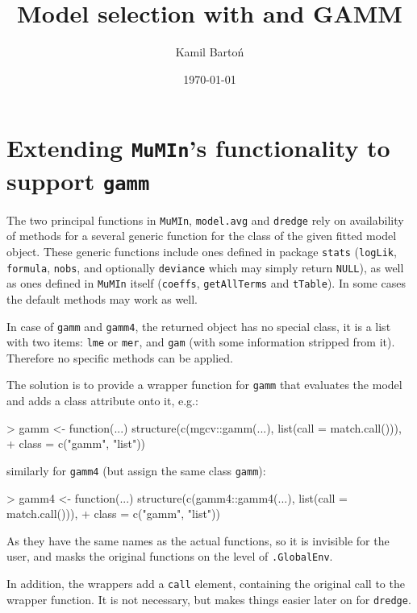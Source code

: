 \documentclass{article}
\title{Model selection with \pkg{MuMIn} and GAMM}
\date{\today}
\author{Kamil Bartoń}
\newcommand{\code}[1]{{\tt #1}}
\newcommand{\pkg}[1]{{\tt #1}}
\begin{document}
\maketitle


\section{Extending \pkg{MuMIn}'s functionality to support \code{gamm} }

The two principal functions in \pkg{MuMIn}, \code{model.avg} and \code{dredge} rely on 
availability of methods for a several generic function for the class of
the given fitted model object. 
These generic functions include ones defined in package \code{stats} 
(\code{logLik}, \code{formula}, \code{nobs}, 
and optionally \code{deviance} which may simply return \code{NULL}), as well 
as ones defined in \pkg{MuMIn} itself (\code{coeffs}, 
\code{getAllTerms} and \code{tTable}). In some cases the default methods may 
work as well.

In case of \code{gamm} and \code{gamm4}, the returned object has no special class, 
it is a list with two items: \code{lme} or \code{mer}, and \code{gam} 
(with some information stripped from it). 
Therefore no specific methods can be applied.

The solution is to provide a wrapper function for \code{gamm} that evaluates 
the model and adds a class attribute onto it, e.g.:
\begin{Schunk}
\begin{Sinput}
> gamm <- function(...) structure(c(mgcv::gamm(...), list(call = match.call())), 
+     class = c("gamm", "list"))
\end{Sinput}
\end{Schunk}
similarly for \code{gamm4} (but assign the same class \code{gamm}):
\begin{Schunk}
\begin{Sinput}
> gamm4 <- function(...) structure(c(gamm4::gamm4(...), list(call = match.call())), 
+     class = c("gamm", "list"))
\end{Sinput}
\end{Schunk}

As they have the same names as the actual functions, so it is invisible for
the user, and masks the original functions on the level of \code{.GlobalEnv}.

In addition, the wrappers add a \code{call} element, containing the original call to the 
wrapper function. It is not necessary, but makes things easier later on for \code{dredge}.
\end{document}

